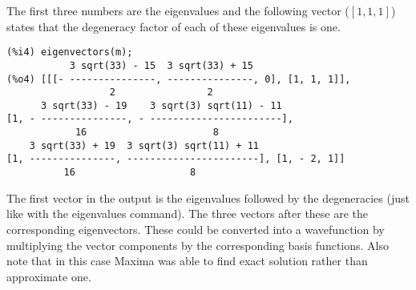 \begin{frame}[fragile]
\otext
The first three numbers are the eigenvalues and the following vector ($\left[1,1,1\right]$) states that the degeneracy factor of each of these eigenvalues is one.

\begin{verbatim}
(%i4) eigenvectors(m);
           3 sqrt(33) - 15  3 sqrt(33) + 15
(%o4) [[[- ---------------, ---------------, 0], [1, 1, 1]], 
                  2                2
      3 sqrt(33) - 19    3 sqrt(3) sqrt(11) - 11
[1, - ---------------, - -----------------------], 
            16                      8
    3 sqrt(33) + 19  3 sqrt(3) sqrt(11) + 11
[1, ---------------, -----------------------], [1, - 2, 1]]
          16                    8
\end{verbatim}

The first vector in the output is the eigenvalues followed by the degeneracies (just like with the eigenvalues command). The three vectors after these are the corresponding eigenvectors. These could be converted into a wavefunction by multiplying the vector components by the corresponding basis functions. Also note that in this case Maxima was able to find exact solution rather than approximate one.

\end{frame}
